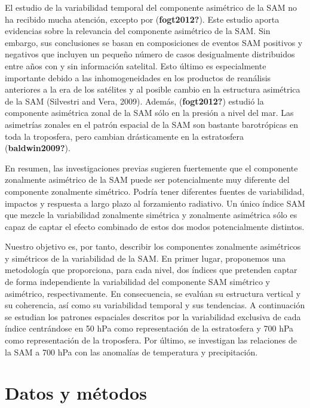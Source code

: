 \documentclass[12pt,oneside]{reedthesis}
\begin{document}
El estudio de la variabilidad temporal del componente asimétrico de la SAM no ha recibido mucha atención, excepto por (\textbf{fogt2012?}).
Este estudio aporta evidencias sobre la relevancia del componente asimétrico de la SAM.
Sin embargo, sus conclusiones se basan en composiciones de eventos SAM positivos y negativos que incluyen un pequeño número de casos desigualmente distribuidos entre años con y sin información satelital.
Esto último es especialmente importante debido a las inhomogeneidades en los productos de reanálisis anteriores a la era de los satélites y al posible cambio en la estructura asimétrica de la SAM (Silvestri and Vera, 2009).
Además, (\textbf{fogt2012?}) estudió la componente asimétrica zonal de la SAM sólo en la presión a nivel del mar.
Las asimetrías zonales en el patrón espacial de la SAM son bastante barotrópicas en toda la troposfera, pero cambian drásticamente en la estratosfera (\textbf{baldwin2009?}).

En resumen, las investigaciones previas sugieren fuertemente que el componente zonalmente asimétrico de la SAM puede ser potencialmente muy diferente del componente zonalmente simétrico.
Podría tener diferentes fuentes de variabilidad, impactos y respuesta a largo plazo al forzamiento radiativo.
Un único índice SAM que mezcle la variabilidad zonalmente simétrica y zonalmente asimétrica sólo es capaz de captar el efecto combinado de estos dos modos potencialmente distintos.

Nuestro objetivo es, por tanto, describir los componentes zonalmente asimétricos y simétricos de la variabilidad de la SAM.
En primer lugar, proponemos una metodología que proporciona, para cada nivel, dos índices que pretenden captar de forma independiente la variabilidad del componente SAM simétrico y asimétrico, respectivamente.
En consecuencia, se evalúan su estructura vertical y su coherencia, así como su variabilidad temporal y sus tendencias.
A continuación se estudian los patrones espaciales descritos por la variabilidad exclusiva de cada índice centrándose en 50 hPa como representación de la estratosfera y 700 hPa como representación de la troposfera.
Por último, se investigan las relaciones de la SAM a 700 hPa con las anomalías de temperatura y precipitación.

\hypertarget{datos-y-muxe9todos-1}{%
\section{Datos y métodos}\label{datos-y-muxe9todos-1}}
\end{document}
